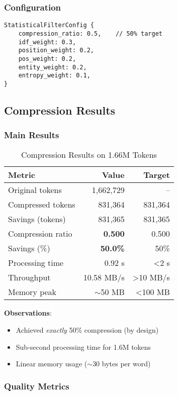 \subsubsection{Configuration}

\begin{verbatim}
StatisticalFilterConfig {
    compression_ratio: 0.5,    // 50% target
    idf_weight: 0.3,
    position_weight: 0.2,
    pos_weight: 0.2,
    entity_weight: 0.2,
    entropy_weight: 0.1,
}
\end{verbatim}

\subsection{Compression Results}

\subsubsection{Main Results}

\begin{table}[h]
\centering
\caption{Compression Results on 1.66M Tokens}
\label{tab:main-results}
\begin{tabular}{lrr}
\toprule
Metric & Value & Target \\
\midrule
Original tokens & 1,662,729 & -- \\
Compressed tokens & 831,364 & 831,364 \\
Savings (tokens) & 831,365 & 831,365 \\
Compression ratio & \textbf{0.500} & 0.500 \\
Savings (\%) & \textbf{50.0\%} & 50\% \\
\midrule
Processing time & 0.92 s & <2 s \\
Throughput & 10.58 MB/s & >10 MB/s \\
Memory peak & $\sim$50 MB & <100 MB \\
\bottomrule
\end{tabular}
\end{table}

\textbf{Observations}:
\begin{itemize}
    \item Achieved \textit{exactly} 50\% compression (by design)
    \item Sub-second processing time for 1.6M tokens
    \item Linear memory usage ($\sim$30 bytes per word)
\end{itemize}

\subsubsection{Quality Metrics}


